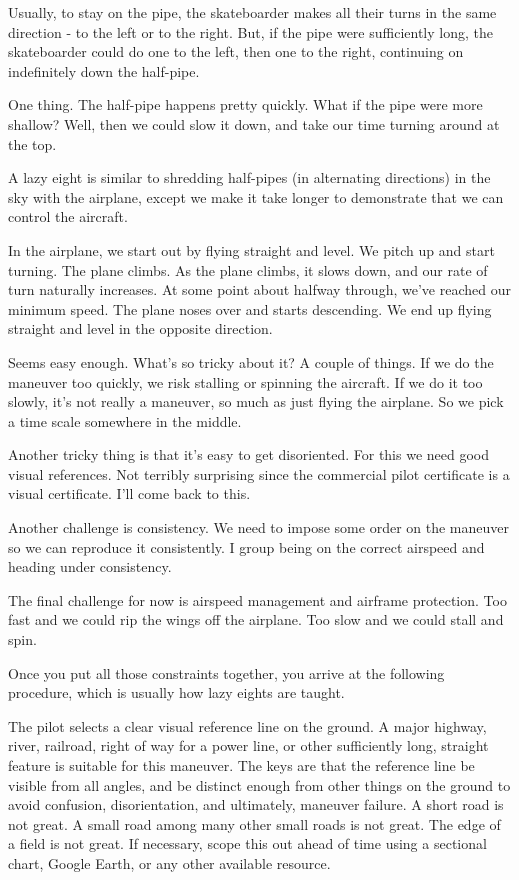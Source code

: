 Usually, to stay on the pipe, the skateboarder makes all their turns in the same direction - to the left or to the right. But, if the pipe were sufficiently long, the skateboarder could do one to the left, then one to the right, continuing on indefinitely down the half-pipe.

One thing. The half-pipe happens pretty quickly. What if the pipe were more shallow? Well, then we could slow it down, and take our time turning around at the top.

A lazy eight is similar to shredding half-pipes (in alternating directions) in the sky with the airplane, except we make it take longer to demonstrate that we can control the aircraft.

In the airplane, we start out by flying straight and level. We pitch up and start turning. The plane climbs. As the plane climbs, it slows down, and our rate of turn naturally increases. At some point about halfway through, we've reached our minimum speed. The plane noses over and starts descending. We end up flying straight and level in the opposite direction.

Seems easy enough. What's so tricky about it? A couple of things. If we do the maneuver too quickly, we risk stalling or spinning the aircraft. If we do it too slowly, it's not really a maneuver, so much as just flying the airplane. So we pick a time scale somewhere in the middle.

Another tricky thing is that it's easy to get disoriented. For this we need good visual references. Not terribly surprising since the commercial pilot certificate is a visual certificate. I'll come back to this.

Another challenge is consistency. We need to impose some order on the maneuver so we can reproduce it consistently. I group being on the correct airspeed and heading under consistency.

The final challenge for now is airspeed management and airframe protection. Too fast and we could rip the wings off the airplane. Too slow and we could stall and spin.

Once you put all those constraints together, you arrive at the following procedure, which is usually how lazy eights are taught.

The pilot selects a clear visual reference line on the ground. A major highway, river, railroad, right of way for a power line, or other sufficiently long, straight feature is suitable for this maneuver. The keys are that the reference line be visible from all angles, and be distinct enough from other things on the ground to avoid confusion, disorientation, and ultimately, maneuver failure. A short road is not great. A small road among many other small roads is not great. The edge of a field is not great. If necessary, scope this out ahead of time using a sectional chart, Google Earth, or any other available resource.

